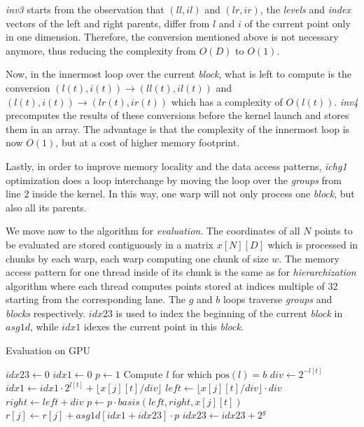 \textit{inv3} starts from the observation that $(ll, il)$ and $(lr, ir)$, the
\textit{levels} and \textit{index} vectors of the left and right parents, differ
from $l$ and $i$ of the current point only in one dimension. Therefore, the
conversion mentioned above is not necessary anymore, thus reducing the
complexity from $O(D)$ to $O(1)$.

Now, in the innermost loop over the current \textit{block}, what is left to
compute is the conversion $(l(t), i(t)) \rightarrow (ll(t), il(t))$ and $(l(t),
i(t)) \rightarrow (lr(t), ir(t))$ which has a complexity of $O(l(t))$.
\textit{inv4} precomputes the results of these conversions before the kernel
launch and stores them in an array. The advantage is that the complexity of the
innermost loop is now $O(1)$, but at a cost of higher memory footprint.

Lastly, in order to improve memory locality and the data access patterns,
\textit{ichg1} optimization does a loop interchange by moving the loop over the
\textit{groups} from line 2 inside the kernel. In this way, one warp will not
only process one \textit{block}, but also all its parents.

We move now to the algorithm for \textit{evaluation}. The coordinates of all $N$
points to be evaluated are stored contiguously in a matrix $x[N][D]$ which is
processed in chunks by each warp, each warp computing one chunk of size $w$. The
memory access pattern for one thread inside of its chunk is the same as for
\textit{hierarchization} algorithm where each thread computes points stored at
indices multiple of 32 starting from the corresponding lane. The $g$ and $b$
loops traverse \textit{groups} and \textit{blocks} respectively.
$\textit{idx23}$ is used to index the beginning of the current \textit{block} in
$\textit{asg1d}$, while $idx1$ idexes the current point in this \textit{block}.

\begin{algorithm}[b]
\small{
	\caption{Evaluation on GPU}
	\label{alg:evaluation}
	\begin{algorithmic}[1]
    		    \State $\textit{idx23} \leftarrow 0$
						\State $\textit{idx1} \leftarrow 0$
						\State $\textit{p} \leftarrow 1$
							\State Compute $l$ for which $\text{pos}(l) = b$
						\EndIf
							\State $div \leftarrow 2^{-l[t]}$
							\State $\textit{idx1} \leftarrow \textit{idx1} \cdot 2^{l[t]} + \lfloor	x[j][t] / div \rfloor$
							\State $left \leftarrow \lfloor x[j][t] / div \rfloor \cdot div$
							\State $right \leftarrow left + div$
							\State $p \leftarrow p \cdot basis(left, right, x[j][t])$
						\EndFor
						\State $r[j] \leftarrow r[j] + \textit{asg1d}[\textit{idx1}	+\textit{idx23}] \cdot p$ 
						\State $\textit{idx23} \leftarrow \textit{idx23} + 2^g$
					\EndFor
				\EndFor
    		\EndFor
    	\EndProcedure
 	\end{algorithmic}
}
\end{algorithm}

